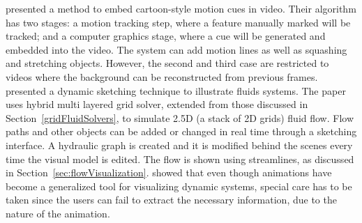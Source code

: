 \cite{Collomosse2005} presented a method to embed cartoon-style motion cues in video.
Their algorithm has two stages: a motion tracking step, where a feature manually marked will be tracked; and a computer graphics stage, where a cue will be generated and embedded into the video.
The system can add motion lines as well as squashing and stretching objects.
However, the second and third case are restricted to videos where the background can be reconstructed from previous frames.
\cite{Zhu2011} presented a dynamic sketching technique to illustrate fluids systems.
The paper uses hybrid multi layered grid solver, extended from those discussed in Section~\ref{gridFluidSolvers}, to simulate 2.5D (a stack of 2D grids) fluid flow.
Flow paths and other objects can be added or changed in real time through a sketching interface.
A hydraulic graph is created and it is modified behind the scenes every time the visual model is edited.
The flow is shown using streamlines, as discussed in Section~\ref{sec:flowVisualization}.
\cite{Lowe2014} showed that even though animations have become a generalized tool for visualizing dynamic systems, special care has to be taken since the users can fail to extract the necessary information, due to the nature of the animation.